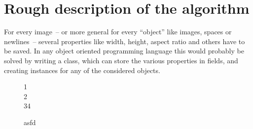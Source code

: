 \documentclass[version=3.12,american]{scrartcl}
\begin{document}
\section{Rough description of the algorithm}
For every image~-- or more general for every ``object'' like  images, spaces or newlines~-- several properties like width, height, aspect ratio and others have to be saved. In any object oriented programming language this would probably be solved by writing a class, which can store the various properties in fields, and creating instances for any of the considered objects.

\begin{figure}
\begin{subfiglist}[cs=0pt,ew=200pt,cfw=10pt]{{1\\2\\3}4}
\end{subfiglist}
\caption{asfd}
\end{figure}
\end{document}
